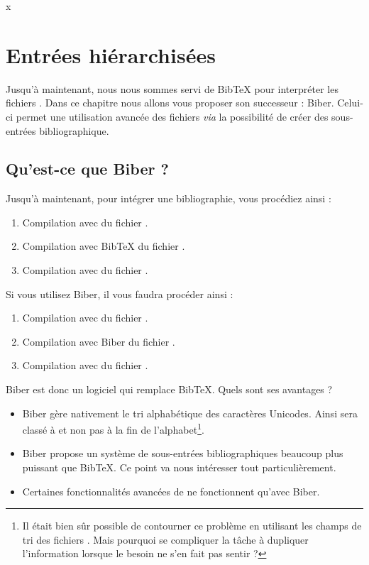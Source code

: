 x\chapter{Entrées hiérarchisées}\label{biber}

\begin{intro}
Jusqu'à maintenant, nous nous sommes servi de BibTeX pour interpréter les fichiers . Dans ce chapitre nous allons vous proposer son successeur : Biber. Celui-ci  permet une utilisation avancée des fichiers  \emph{via} la possibilité de créer des sous-entrées bibliographique.
\end{intro}

\section{Qu'est-ce que Biber ?}

Jusqu'à maintenant, pour intégrer une bibliographie, vous procédiez ainsi :
\begin{enumerate}
\item Compilation avec \XeLaTeX du fichier .
\item Compilation avec BibTeX du fichier .
\item Compilation avec \XeLaTeX du fichier .
\end{enumerate}

Si vous utilisez Biber, il vous faudra procéder ainsi :

\begin{enumerate}
\item Compilation avec \XeLaTeX du fichier .
\item Compilation avec Biber du fichier .
\item Compilation avec \XeLaTeX du fichier .
\end{enumerate}

Biber est donc un logiciel qui remplace BibTeX. Quels sont ses avantages ?

\begin{itemize}
\item Biber gère nativement le tri alphabétique des caractères Unicodes. Ainsi  sera classé à  et non pas à la fin de l'alphabet\footnote{Il était bien sûr possible de contourner ce problème en utilisant les champs de tri des fichiers . Mais pourquoi se compliquer la tâche à dupliquer l'information lorsque le besoin ne s'en fait pas sentir ?}.
\item Biber propose un système de sous-entrées bibliographiques beaucoup plus puissant que BibTeX. Ce  point  va nous intéresser tout particulièrement.
\item Certaines fonctionnalités avancées de  ne fonctionnent qu'avec Biber.
\end{itemize}

